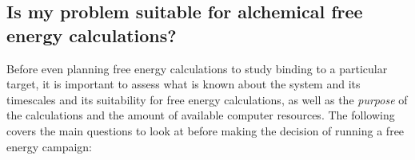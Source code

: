\documentclass[9pt,bestpractices]{livecoms}
\begin{document}

\subsection{Is my problem suitable for alchemical free energy calculations?}
\label{subsec:suitability}
Before even planning free energy calculations to study binding to a
particular target, it is important to assess what is known about the
system and its timescales and its suitability for free energy
calculations, as well as the \emph{purpose} of the calculations and
the amount of available computer resources. The following covers the main questions to look at before making the decision of running a free energy campaign:
\end{document}
